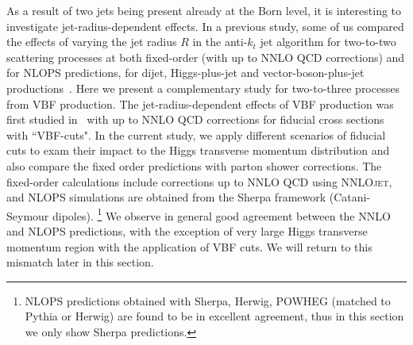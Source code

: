 \documentclass[10pt,prd,fleqn,superscriptaddress,notitlepage,nofootinbib,preprintnumbers,nobalancelastpage]{revtex4-1}
\newcommand{\NNLOJET}{\textsc{NNLOjet}\xspace}
\newcommand{\VBF}{VBF\xspace}
\begin{document}
As a result of two jets being present already at the Born level, it is interesting to investigate jet-radius-dependent effects. %
In a previous study, some of us compared the effects of varying the jet radius $R$ in the anti-$k_t$ jet algorithm for two-to-two scattering processes at both fixed-order (with up to NNLO QCD corrections) and for NLOPS predictions, for dijet, Higgs-plus-jet and vector-boson-plus-jet productions~\cite{Bellm:2019yyh}. Here we present a complementary study for two-to-three processes from \VBF production. The jet-radius-dependent effects of \VBF production was first studied in~\cite{Rauch:2017cfu} with up to NNLO QCD corrections for fiducial cross sections with ``VBF-cuts". In the current study, we apply different scenarios of fiducial cuts to exam their impact to the Higgs transverse momentum distribution and also compare the fixed order predictions with parton shower corrections.
The fixed-order calculations include corrections up to NNLO QCD  using \NNLOJET, and NLOPS simulations are obtained from the Sherpa framework (Catani-Seymour dipoles).%
\footnote{NLOPS predictions obtained with Sherpa, Herwig, POWHEG (matched to Pythia or Herwig) are found to be in excellent agreement, thus in this section we only show Sherpa predictions.}
We observe in general good agreement between  the NNLO and NLOPS predictions,  with the exception of very large Higgs transverse momentum region with the application of VBF cuts. We will return to this mismatch later in this section.
\end{document}

